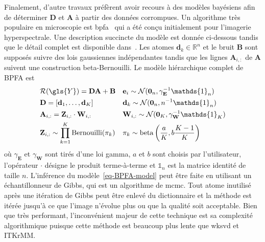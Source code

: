 Finalement, d'autre travaux préfèrent avoir recours à des modèles bayésiens afin de déterminer $\mathbf{D}$ et $\mathbf{A}$ à partir des données corrompues. Un algorithme très populaire en microscopie est \gls{bpfa}~\cite{xing2012siam} qui a été conçu initialement pour l'imagerie hyperspectrale. Une description succincte du modèle est donnée ci-dessous tandis que le détail complet est disponible dans~\cite{xing2012siam}. Les atomes $\mathbf{d}_k\in\mathbb{R}^n$ et le bruit $\mathbf{B}$ sont supposés suivre des lois gaussiennes indépendantes tandis que les lignes $\mathbf{A}_{i, :}$ de $\mathbf{A}$ suivent une construction beta-Bernouilli. Le modèle hiérarchique complet de BPFA est
\begin{equation}\label{eq-BPFA-model}
\begin{aligned}
    &\mathcal{R}(\gls{Y}) = \mathbf{D A + B} 
    &&\mathbf{e}_i\sim\mathcal{N}(\mathbf{0}_n, \gamma_\mathbf{E}^{-1}\mathds{1}_n)\\
    &\mathbf{D} = [\mathbf{d}_1, \dots, \mathbf{d}_K]
    &&\mathbf{d}_k\sim\mathcal{N}(\mathbf{0}_n, n^{-1}\mathds{1}_n)\\
    &\mathbf{A}_{i, :} = \mathbf{Z}_{i, :}\cdot \mathbf{W}_{i, :}
    &&\mathbf{W}_{i, :}\sim\mathcal{N}(\mathbf{0}_K, \gamma_\mathbf{W}^{-1}\mathds{1}_K)\\
    &\mathbf{Z}_{i, :}\sim \prod_{k=1}^{K}\mathrm{Bernouilli}(\pi_k)
    &&\pi_k\sim\mathrm{beta}\left( \frac{a}{K}, b\frac{K-1}{K} \right)
\end{aligned}
\end{equation}
où $\gamma_\mathbf{E}$ et $\gamma_\mathbf{W}$ sont tirés d'une loi gamma, $a$ et $b$ sont choisis par l'utilisateur, l'opérateur $\cdot$ désigne le produit terme-à-terme et $\mathds{1}_n$ est la matrice identité de taille $n$. L'inférence du modèle~\eqref{eq-BPFA-model} peut être faite en utilisant un échantillonneur de Gibbs, qui est un algorithme de \gls{mcmc}. Tout atome inutilisé après une itération de Gibbs peut être enlevé du dictionnaire et la méthode est itérée jusqu'à ce que l'image n'évolue plus ou que la qualité soit acceptable. Bien que très performant, l'inconvénient majeur de cette technique est sa complexité algorithmique puisque cette méthode est beaucoup plus lente que \gls{wksvd} et ITKrMM.

